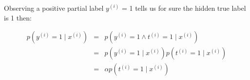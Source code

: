 \begin{answer}

Observing a positive partial label $y^{(i)}$ = 1 tells us for sure the hidden true label is 1 then: 

\begin{eqnarray*}
p(y^{(i)} =1\mid x^{(i)}) &=& p(y^{(i)} = 1  \land t
^{(i)} = 1\mid x^{(i)})\\
&=& p(y^{(i)} = 1 \mid x^{(i)}) p(t^{(i)} = 1 \mid x^{(i)})\\
&=& \alpha p(t^{(i)} = 1 \mid x^{(i)})

\end{eqnarray*}
\end{answer}
